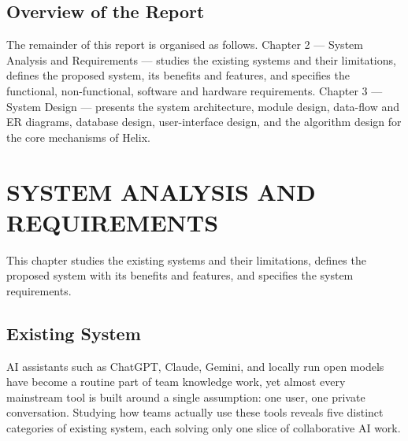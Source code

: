 \documentclass[12pt,a4paper]{report}
\begin{document}
\section{Overview of the Report}
The remainder of this report is organised as follows. Chapter 2 --- System Analysis and Requirements --- studies the existing systems and their limitations, defines the proposed system, its benefits and features, and specifies the functional, non-functional, software and hardware requirements. Chapter 3 --- System Design --- presents the system architecture, module design, data-flow and ER diagrams, database design, user-interface design, and the algorithm design for the core mechanisms of Helix.

\chapter{SYSTEM ANALYSIS AND REQUIREMENTS}
This chapter studies the existing systems and their limitations, defines the proposed system with its benefits and features, and specifies the system requirements.

\section{Existing System}
AI assistants such as ChatGPT, Claude, Gemini, and locally run open models have become a routine part of team knowledge work, yet almost every mainstream tool is built around a single assumption: one user, one private conversation. Studying how teams actually use these tools reveals five distinct categories of existing system, each solving only one slice of collaborative AI work.
\end{document}
